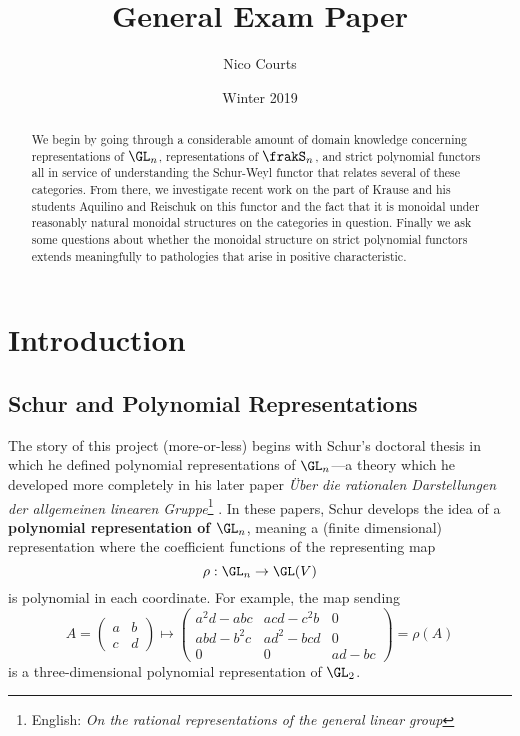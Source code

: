 \documentclass[12pt]{article}
\begin{document}
\title{General Exam Paper \vspace{-1ex}}
\author{Nico Courts}
\date{Winter 2019}
\maketitle

\begin{abstract}
	We begin by going through a considerable amount of domain knowledge concerning representations of $\GL_n$,
	representations of $\frakS_n$, and strict polynomial functors all in service of understanding the Schur-Weyl 
	functor that relates several of these categories. From there, we investigate recent work on the part of Krause 
	and his students Aquilino and Reischuk on this functor and the fact that it is monoidal under reasonably natural monoidal structures on 
	the categories in question. Finally we ask some questions about whether the monoidal structure on strict polynomial functors 
	extends meaningfully to pathologies that arise in positive characteristic.
\end{abstract}

\newpage
\renewcommand{\baselinestretch}{0.75}\normalsize
\setcounter{tocdepth}{3}
\tableofcontents
\renewcommand{\baselinestretch}{1.0}\normalsize

\newpage
\section{Introduction}
\subsection{Schur and Polynomial Representations}
The story of this project (more-or-less) begins with Schur's doctoral thesis \cite{schur-thesis} in which he defined
polynomial representations of $\GL_n$---a theory which he developed more completely in his later paper \textit{\"Uber die 
rationalen Darstellungen der allgemeinen linearen Gruppe}\footnote{English: \textit{On the rational representations of the general linear group}}
\cite{schur-rational}. In these papers, Schur develops the idea of a \textbf{polynomial representation of $\GL_n$},
meaning a (finite dimensional) representation where the coefficient functions of the representing map 
\[\rho:\GL_n\to \GL(V)\]
is polynomial in each coordinate. For example, the map sending 
\[A=\begin{pmatrix}
	a&b\\
	c&d
\end{pmatrix}\mapsto \begin{pmatrix}
	a^2d-abc & acd-c^2b & 0\\
	abd-b^2c & ad^2-bcd & 0\\
	0 & 0 & ad-bc
\end{pmatrix}=\rho(A)\]
is a three-dimensional polynomial representation of $\GL_2$.
\end{document}
